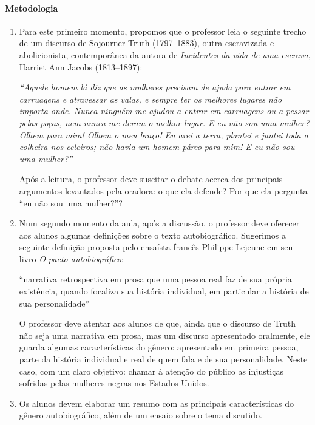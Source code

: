\documentclass[11pt]{extarticle}
\begin{document}
\paragraph{Metodologia}

   \begin{enumerate}
    \item 
    Para este primeiro momento, propomos que o professor leia o seguinte trecho
    de um discurso de Sojourner Truth (1797--1883), outra escravizada e abolicionista, contemporânea
    da autora de \textit{Incidentes da vida de uma escrava}, Harriet Ann Jacobs (1813--1897):

    \textit{``Aquele homem lá diz que as mulheres precisam de ajuda para entrar em carruagens
    e atravessar as valas, e sempre ter os melhores lugares não importa onde. Nunca ninguém
    me ajudou a entrar em carruagens ou a pessar pelas poças, nem nunca me deram o melhor
    lugar. E eu não sou uma mulher? Olhem para mim! Olhem o meu braço! Eu arei a terra, 
    plantei e juntei toda a colheira nos celeiros; não havia um homem páreo para mim! 
    E eu não sou uma mulher?''}

    Após a leitura, o professor deve suscitar o debate acerca dos principais argumentos 
    levantados pela oradora: o que ela defende? Por que ela pergunta ``eu não sou uma mulher?''?




    \item
    Num segundo momento da aula, após a discussão, o professor deve oferecer aos alunos algumas 
    definições sobre o texto autobiográfico. Sugerimos a seguinte definição
    proposta pelo ensaísta francês Philippe Lejeune em seu livro \emph{O pacto autobiográfico}:

    ``narrativa retrospectiva em prosa que uma pessoa real faz de sua própria existência, 
    quando focaliza sua história individual, em particular a história de sua personalidade'' 

    O professor deve atentar aos alunos de que, ainda que o discurso de Truth não seja uma 
    narrativa em prosa, mas um discurso apresentado oralmente, ele guarda algumas características
    do gênero: apresentado em primeira pessoa, parte da história individual e real de quem fala
    e de sua personalidade. Neste caso, com um claro objetivo: chamar à atenção do público
    as injustiças sofridas pelas mulheres negras nos Estados Unidos.

    \item
    Os alunos devem elaborar um resumo com as principais características do gênero autobiográfico,
    além de um ensaio sobre o tema discutido.


   \end{enumerate}
\end{document}
